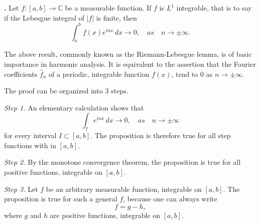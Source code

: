 \documentclass[12pt]{article}
\newcommand{\cnums}{\mathbb{C}}
\begin{document}
\noindent
{\bf {}.}
Let $f:[a,b]\rightarrow\cnums$ be a measurable function.  If $f$ is
$L^1$ integrable, that is to say if the Lebesgue integral of $|f|$ is
finite, then
$$\int^b_a f(x) e^{inx}\,dx \rightarrow 0,\quad{as}\quad n\rightarrow
\pm\infty.$$


The above result, commonly known as the Riemann-Lebesgue lemma, is of
basic importance in harmonic analysis.  It is equivalent to the
assertion that the Fourier coefficients $\hat{f}_n$ of a periodic, integrable
function $f(x)$, tend to $0$ as $n\rightarrow \pm\infty$.

The proof can be organized into 3 steps.

\noindent
\emph{Step 1.}  An elementary calculation shows that 
$$\int_I e^{inx}\,dx \rightarrow 0,\quad{as}\quad n\rightarrow
\pm\infty$$
for every interval $I\subset[a,b]$. The proposition is therefore true
for all step functions with  in $[a,b]$.

\noindent
\emph{Step 2.}  
By the monotone convergence theorem, the proposition is true for all
positive functions, integrable on $[a,b]$.

\noindent
\emph{Step 3.}  Let $f$ be an arbitrary measurable function,
integrable on $[a,b]$.  The proposition is true for such a general
$f$, because one can always write 
$$f=g-h,$$
where $g$ and $h$ are positive functions, integrable on
$[a,b]$.
\end{document}
